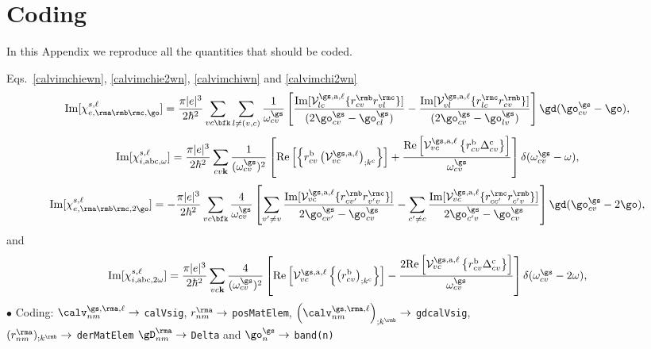\chapter{Coding}\label{code}

In this Appendix we reproduce all the quantities  that should be coded.

Eqs.~\eqref{calvimchiewn}, \eqref{calvimchie2wn}, \eqref{calvimchiwn}
 and \eqref{calvimchi2wn}
\begin{equation}\label{calvimchiewn}
\mathrm{Im}[\chi_{e,\rma\rmb\rmc,\go}^{s,\ell}] =
\frac{\pi |e|^3}{2\hbar^2}\sum_{vc\bfk}\sum_{l\neq(v,c)}\frac{1}{\omega^\gs_{cv}}
\left[
\frac{\mathrm{Im}[\mathcal{V}^{\gs,\text{a},\ell}_{lc}\{r^{\rmb}_{cv}r^{\rmc}_{vl}\}]}
{(2\go^\gs_{cv}-\go^\gs_{cl})} 
-\frac{\mathrm{Im}[\mathcal{V}^{\gs,\text{a},\ell}_{vl}\{r^{\rmc}_{lc}r^{\rmb}_{cv}\}]}
{(2\go^\gs_{cv}-\go^\gs_{lv})}
\right]\gd(\go^\gs_{cv}-\go),
\end{equation}  
\begin{equation}\label{calvimchiwn}
\mathrm{Im}[\chi_{i,\text{a}\text{b}\text{c},\omega}^{s,\ell}]
= \frac{\pi\vert e\vert^3}{2\hbar^2}\sum_{cv\mathbf{k}}\frac{1}{(\omega^\gs_{cv})^{2}}
\left[
\mathrm{Re}\left[\left\{r^{\text{b}}_{cv}\left(\mathcal{V}^{\gs,\text{a},\ell}_{vc}\right)_{;k^{\text{c}}}\right\}\right]
+\frac{\mathrm{Re}\left[\mathcal{V}^{\gs,\text{a},\ell}_{vc}\left\{r^{\text{b}}_{cv}
\Delta^{\text{c}}_{cv}\right\}\right]}{\omega^\gs_{cv}} 
\right]\delta(\omega^\gs_{cv}-\omega),
\end{equation}
\begin{equation}\label{calvimchie2wn}
\mathrm{Im}[\chi_{e,\rma\rmb\rmc,2\go}^{s,\ell}] =
-\frac{\pi |e|^3}{2\hbar^2}\sum_{vc\bfk}\frac{4}{\omega^\gs_{cv}}
\left[
\sum_{v'\ne
  v}\frac{\mathrm{Im}[\mathcal{V}^{\gs,\text{a},\ell}_{vc}\{r^{\rmb}_{cv'}r^{\rmc}_{v'v}\}]}
{2\go^\gs_{cv'}-\go^\gs_{cv}}
- \sum_{c'\ne
  c}\frac{\mathrm{Im}[\mathcal{V}^{\gs,\text{a},\ell}_{vc}\{r^{\rmc}_{cc'}r^{\rmb}_{c'v}\}]}
{2\go^\gs_{c'v}-\go^\gs_{cv}}
\right]\gd(\go^\gs_{cv}-2\go),
\end{equation}
and
\begin{equation}\label{calvimchi2wn}
\mathrm{Im}[\chi_{i,\text{a}\text{b}\text{c},2\omega}^{s,\ell}] 
=
 \frac{\pi \vert
   e\vert^{3}}{2\hbar^2}\sum_{vc\mathbf{k}}\frac{4}{(\omega^\gs_{cv})^{2}}
\left[\mathrm{Re}\left[\mathcal{V}^{\gs,\text{a},\ell}_{vc}\left\{\left(r^{\text{b}}_{cv}\right)_{;k^{\text{c}}}
\right\}\right] -
\frac{2\mathrm{Re}\left[\mathcal{V}^{\gs,\text{a},\ell}_{vc}\left\{r^{\text{b}}_{cv}
\Delta^{\text{c}}_{cv}\right\}\right]}{\omega^\gs_{cv}}\right]\delta(\omega^\gs_{cv}-2\omega)
,
\end{equation}
\noindent$\bullet$ Coding:
$\calv^{\gs,\rma,\ell}_{nm}\to$ \verb=calVsig=,
$r^\rma_{nm}\to$ \verb=posMatElem=,
$\left(\calv^{\gs,\rma,\ell}_{nm}\right)_{;k^\rmb}\to$ \verb=gdcalVsig=,
\\ $(r^\rma_{nm})_{;k^\rmb}\to$ \verb=derMatElem= 
$\gD^\rma_{nm}\to$ \verb=Delta= and $\go^\gs_n\to$ \verb=band(n)=

